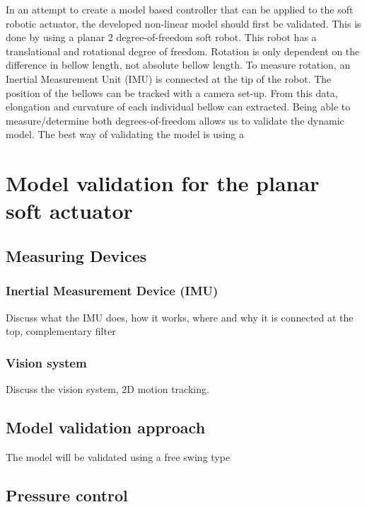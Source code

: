 In an attempt to create a model based controller that can be applied to the soft robotic actuator, the developed non-linear model should first be validated. This is done by using a planar 2 degree-of-freedom soft robot. This robot has a translational and rotational degree of freedom.  Rotation is only dependent on the difference in bellow length, not absolute bellow length. To measure rotation, an Inertial Measurement Unit (IMU) is connected at the tip of the robot. The position of the bellows can be tracked with a camera set-up. From this data, elongation and curvature of each individual bellow can extracted. Being able to measure/determine both degrees-of-freedom allows us to validate the dynamic model. The best way of validating the model is using a 


\section{Model validation for the planar soft actuator}


\subsection{Measuring Devices}


\subsubsection{Inertial Measurement Device (IMU)}


Discuss what the IMU does, how it works, where and why it is connected at the top, complementary filter



\subsubsection{Vision system}

Discuss the vision system, 2D motion tracking.



\subsection{Model validation approach}

The model will be validated using a free swing type





\subsection{Pressure control}


